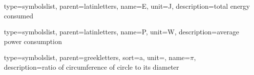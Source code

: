 

%
%


{
	type=symbolslist,
	parent=latinletters,
	name={E},
	unit={\si{\joule}},
	description={total energy consumed}
}

{
	type=symbolslist,
	parent=latinletters,
	name={P},
	unit={\si{\watt}},
	description={average power consumption}
}


{
	type=symbolslist,
	parent=greekletters,
	sort=a,
	unit={},
	name={\ensuremath{\pi}},
	description={ratio of circumference of circle to its diameter}
}




 
